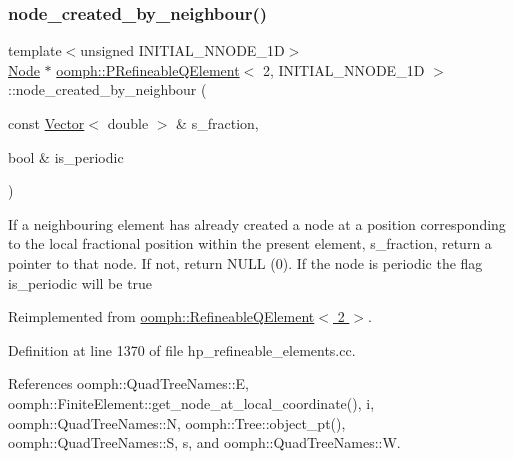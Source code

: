 \subsubsection{\texorpdfstring{node\+\_\+created\+\_\+by\+\_\+neighbour()}{node\_created\_by\_neighbour()}}
{\footnotesize\ttfamily template$<$unsigned I\+N\+I\+T\+I\+A\+L\+\_\+\+N\+N\+O\+D\+E\+\_\+1D$>$ \\
\hyperlink{classoomph_1_1Node}{Node} $\ast$ \hyperlink{classoomph_1_1PRefineableQElement}{oomph\+::\+P\+Refineable\+Q\+Element}$<$ 2, I\+N\+I\+T\+I\+A\+L\+\_\+\+N\+N\+O\+D\+E\+\_\+1D $>$\+::node\+\_\+created\+\_\+by\+\_\+neighbour (\begin{DoxyParamCaption}\item[{const \hyperlink{classoomph_1_1Vector}{Vector}$<$ double $>$ \&}]{s\+\_\+fraction,  }\item[{bool \&}]{is\+\_\+periodic }\end{DoxyParamCaption})\hspace{0.3cm}{\ttfamily [virtual]}}

If a neighbouring element has already created a node at a position corresponding to the local fractional position within the present element, s\+\_\+fraction, return a pointer to that node. If not, return N\+U\+LL (0). If the node is periodic the flag is\+\_\+periodic will be true 

Reimplemented from \hyperlink{classoomph_1_1RefineableQElement_3_012_01_4_acf706049e7394cafa3d5f979222b907e}{oomph\+::\+Refineable\+Q\+Element$<$ 2 $>$}.



Definition at line 1370 of file hp\+\_\+refineable\+\_\+elements.\+cc.



References oomph\+::\+Quad\+Tree\+Names\+::E, oomph\+::\+Finite\+Element\+::get\+\_\+node\+\_\+at\+\_\+local\+\_\+coordinate(), i, oomph\+::\+Quad\+Tree\+Names\+::N, oomph\+::\+Tree\+::object\+\_\+pt(), oomph\+::\+Quad\+Tree\+Names\+::S, s, and oomph\+::\+Quad\+Tree\+Names\+::W.

\mbox{\label{classoomph_1_1PRefineableQElement_3_012_00_01INITIAL__NNODE__1D_01_4_abe1f777a74c6996aaa3cfbdb2dee1c72}} 

